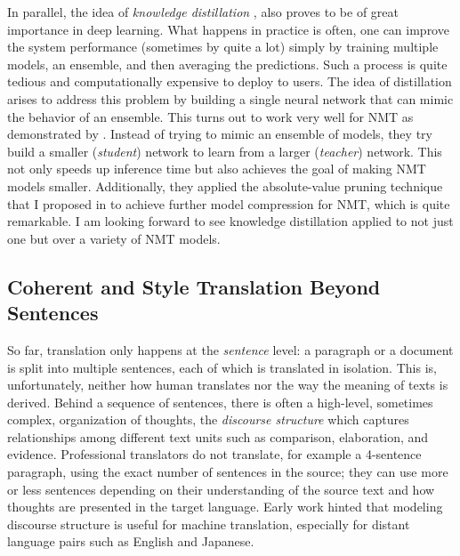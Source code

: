 In parallel, the idea of {\it knowledge distillation} \cite{hinton15}, also proves to be of great importance in deep learning. What happens in practice is often, one can improve the system performance (sometimes by quite a lot) simply by training multiple models, an ensemble, and then averaging the predictions. Such a process is quite tedious and computationally expensive to deploy to users. The idea of distillation arises to address this problem by building a single neural network that can mimic the behavior of an ensemble. This turns out to work very well for NMT as demonstrated by . Instead of trying to mimic an ensemble of models, they try build a smaller ({\it student}) network to learn from a larger ({\it teacher}) network. This not only speeds up inference time but also achieves the goal of making NMT models smaller. Additionally, they applied the absolute-value pruning technique that I proposed in  to achieve further model compression for NMT, which is quite remarkable. I am looking forward to see knowledge distillation applied to not just one but over a variety of NMT models.

\subsection{Coherent and Style Translation Beyond Sentences}
So far, translation only happens at the {\it sentence} level: a paragraph or a document is split into multiple sentences, each of which is translated in isolation. This is, unfortunately, neither how human translates nor the way the meaning of texts is derived. Behind a sequence of sentences, there is often a high-level, sometimes complex, organization of thoughts, the {\it discourse structure} \cite{mann1988} which captures relationships among different text units such as comparison, elaboration, and evidence. Professional translators do not translate, for example a 4-sentence paragraph, using the exact number of sentences in the source; they can use more or less sentences depending on their understanding of the source text and how thoughts are presented in the target language. Early work \cite{marcu2000} hinted that modeling discourse structure is useful for machine translation, especially for distant language pairs such as English and Japanese.

